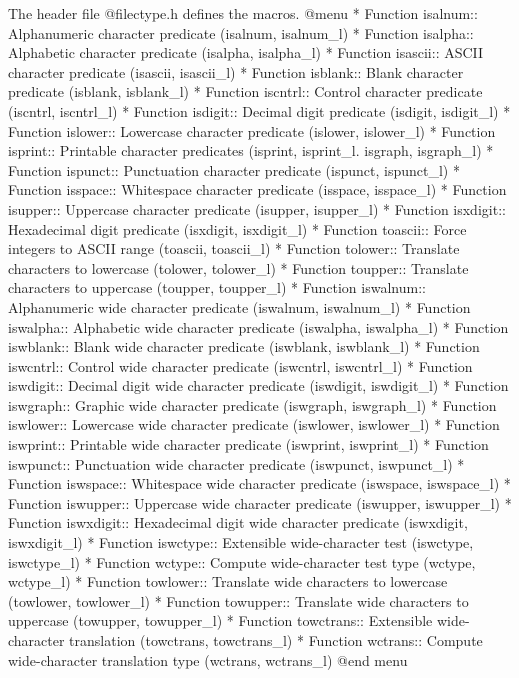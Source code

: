 The header file @file{ctype.h} defines the macros.
@menu
* Function isalnum::   Alphanumeric character predicate (isalnum, isalnum_l)
* Function isalpha::   Alphabetic character predicate (isalpha, isalpha_l)
* Function isascii::   ASCII character predicate (isascii, isascii_l)
* Function isblank::   Blank character predicate (isblank, isblank_l)
* Function iscntrl::   Control character predicate (iscntrl, iscntrl_l)
* Function isdigit::   Decimal digit predicate (isdigit, isdigit_l)
* Function islower::   Lowercase character predicate (islower, islower_l)
* Function isprint::   Printable character predicates (isprint, isprint_l. isgraph, isgraph_l)
* Function ispunct::   Punctuation character predicate (ispunct, ispunct_l)
* Function isspace::   Whitespace character predicate (isspace, isspace_l)
* Function isupper::   Uppercase character predicate (isupper, isupper_l)
* Function isxdigit::  Hexadecimal digit predicate (isxdigit, isxdigit_l)
* Function toascii::   Force integers to ASCII range (toascii, toascii_l)
* Function tolower::   Translate characters to lowercase (tolower, tolower_l)
* Function toupper::   Translate characters to uppercase (toupper, toupper_l)
* Function iswalnum::  Alphanumeric wide character predicate (iswalnum, iswalnum_l)
* Function iswalpha::  Alphabetic wide character predicate (iswalpha, iswalpha_l)
* Function iswblank::  Blank wide character predicate (iswblank, iswblank_l)
* Function iswcntrl::  Control wide character predicate (iswcntrl, iswcntrl_l)
* Function iswdigit::  Decimal digit wide character predicate (iswdigit, iswdigit_l)
* Function iswgraph::  Graphic wide character predicate (iswgraph, iswgraph_l)
* Function iswlower::  Lowercase wide character predicate (iswlower, iswlower_l)
* Function iswprint::  Printable wide character predicate (iswprint, iswprint_l)
* Function iswpunct::  Punctuation wide character predicate (iswpunct, iswpunct_l)
* Function iswspace::  Whitespace wide character predicate (iswspace, iswspace_l)
* Function iswupper::  Uppercase wide character predicate (iswupper, iswupper_l)
* Function iswxdigit:: Hexadecimal digit wide character predicate (iswxdigit, iswxdigit_l)
* Function iswctype::  Extensible wide-character test (iswctype, iswctype_l)
* Function wctype::    Compute wide-character test type (wctype, wctype_l)
* Function towlower::  Translate wide characters to lowercase (towlower, towlower_l)
* Function towupper::  Translate wide characters to uppercase (towupper, towupper_l)
* Function towctrans:: Extensible wide-character translation (towctrans, towctrans_l)
* Function wctrans::   Compute wide-character translation type (wctrans, wctrans_l)
@end menu

